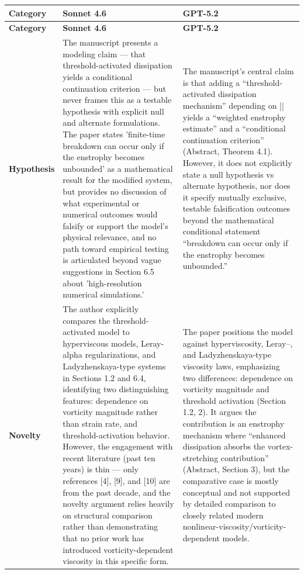 \documentclass[11pt]{article}
\begin{document}
\begin{longtable}{@{} p{2.2cm} p{6.3cm} p{6.3cm} @{}}
\toprule
\textbf{Category} & \textbf{Sonnet 4.6} & \textbf{GPT-5.2} \\
\midrule
\endfirsthead
\toprule
\textbf{Category} & \textbf{Sonnet 4.6} & \textbf{GPT-5.2} \\
\midrule
\endhead
\bottomrule
\endlastfoot

\rowcolor{rowgray}
\textbf{Hypothesis} &
The manuscript presents a modeling claim --- that threshold-activated dissipation yields a conditional continuation criterion --- but never frames this as a testable hypothesis with explicit null and alternate formulations. The paper states 'finite-time breakdown can occur only if the enstrophy becomes unbounded' as a mathematical result for the modified system, but provides no discussion of what experimental or numerical outcomes would falsify or support the model's physical relevance, and no path toward empirical testing is articulated beyond vague suggestions in Section 6.5 about 'high-resolution numerical simulations.' &
The manuscript's central claim is that adding a ``threshold-activated dissipation mechanism'' depending on |\textomega{}| yields a ``weighted enstrophy estimate'' and a ``conditional continuation criterion'' (Abstract, Theorem 4.1). However, it does not explicitly state a null hypothesis vs alternate hypothesis, nor does it specify mutually exclusive, testable falsification outcomes beyond the mathematical conditional statement ``breakdown can occur only if the enstrophy becomes unbounded.'' \\[6pt]

\textbf{Novelty} &
The author explicitly compares the threshold-activated model to hyperviscous models, Leray-alpha regularizations, and Ladyzhenskaya-type systems in Sections 1.2 and 6.4, identifying two distinguishing features: dependence on vorticity magnitude rather than strain rate, and threshold-activation behavior. However, the engagement with recent literature (past ten years) is thin --- only references [4], [9], and [10] are from the past decade, and the novelty argument relies heavily on structural comparison rather than demonstrating that no prior work has introduced vorticity-dependent viscosity in this specific form. &
The paper positions the model against hyperviscosity, Leray--\textalpha{}, and Ladyzhenskaya-type viscosity laws, emphasizing two differences: dependence on vorticity magnitude and threshold activation (Section 1.2, 2). It argues the contribution is an enstrophy mechanism where ``enhanced dissipation absorbs the vortex-stretching contribution'' (Abstract, Section 3), but the comparative case is mostly conceptual and not supported by detailed comparison to closely related modern nonlinear-viscosity/vorticity-dependent models. \\[6pt]


\end{longtable}
\end{document}
